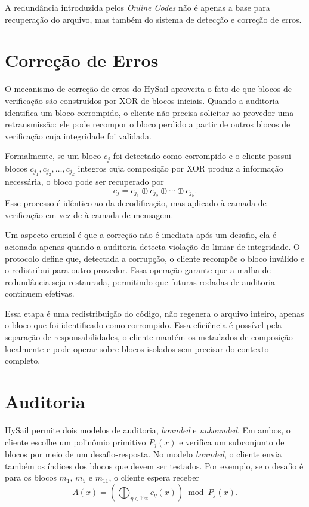 A redundância introduzida pelos \emph{Online Codes} não é apenas a base para recuperação do arquivo, mas também
do sistema de detecção e correção de erros.

\section{Correção de Erros}%
O mecanismo de correção de erros do HySail aproveita o fato de que blocos de verificação são construídos por XOR
de blocos iniciais. Quando a auditoria identifica um bloco corrompido, o cliente não precisa solicitar
ao provedor uma retransmissão: ele pode recompor o bloco perdido a partir de outros blocos de verificação cuja
integridade foi validada.

Formalmente, se um bloco \(c_j\) foi detectado como corrompido e o cliente possui blocos \(c_{j_1}, c_{j_2}, \ldots, c_{j_k}\)
integros cuja composição por XOR produz a informação necessária, o bloco pode ser recuperado por
\[
c_j = c_{j_1} \oplus c_{j_2} \oplus \cdots \oplus c_{j_k}.
\]
Esse processo é idêntico ao da decodificação, mas aplicado à camada de verificação em vez de à camada de mensagem.

Um aspecto crucial é que a correção não é imediata após um desafio, ela é acionada apenas quando a auditoria
detecta violação do limiar de integridade. O protocolo define que, detectada a corrupção, o cliente recompõe o bloco
inválido e o redistribui para outro provedor. Essa operação garante que a
malha de redundância seja restaurada, permitindo que futuras rodadas de auditoria continuem efetivas.

Essa etapa é uma redistribuição do código, não regenera o arquivo inteiro, apenas o bloco
que foi identificado como corrompido. Essa eficiência é possível pela separação de responsabilidades, o cliente mantém os
metadados de composição localmente e pode operar sobre blocos isolados sem precisar do contexto completo.

\section{Auditoria}%
HySail permite dois modelos de auditoria, \textit{bounded} e \textit{unbounded}. Em ambos, o cliente escolhe um polinômio
primitivo \(P_j(x)\) e verifica um subconjunto de blocos por meio de um desafio-resposta. No modelo \textit{bounded},
o cliente envia também os índices dos blocos que devem ser testados. Por exemplo, se o desafio é para os blocos \(m_1\), \(m_5\) e \(m_{11}\), o cliente espera receber
\[
A(x) = \left(\bigoplus_{\eta \in \mathrm{list}} c_\eta(x)\right) \bmod P_j(x).
\]

